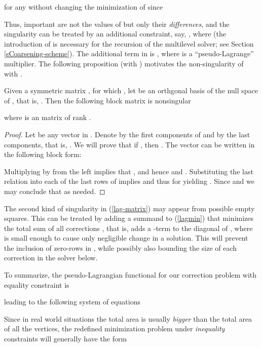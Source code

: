 \documentclass[final]{siamltex}
\begin{document}
for any  without changing the minimization of  since

Thus, important are not the values of  but only their
{\it differences}, and the singularity can be treated by an
additional constraint, say, , where  (the introduction of  is necessary for
the recursion of the multilevel solver; see Section
\ref{sCoarsening-scheme}). The additional term in
 is , where 
is a ``pseudo-Lagrange'' multiplier. The following proposition
(with ) motivates the non-singularity of  with .
\begin{proposition}
Given a symmetric  matrix , for which , let  be an orthgonal basis of the null space of
, that is, . Then the following block matrix  is
nonsingular

where  is an  matrix of rank .
\end{proposition}
\vspace{3mm}
\begin{proof}
Let  be any vector in . Denote by  the
first  components of  and by  the last  components,
that is, . We will prove that if
, then . The vector  can be written in the following
block form:

Multiplying  by  from the left implies that
, and hence  and .
Substituting the last relation into each of the last  rows of
 implies  and thus  for 
yielding . Since  and  we may conclude that
 as needed.
\end{proof}



\par The second kind of singularity in (\ref{lag-matrix}) may appear from possible empty squares. This
can be treated by adding a summand to (\ref{lagmin}) that
minimizes the total sum of all corrections , that is,  adds a -term to the diagonal of
, where  is small enough to cause only
negligible change in a solution. This will prevent the inclusion
of zero-rows in , while possibly also bounding the
size of each correction in the solver below.
\par To summarize, the pseudo-Lagrangian functional  for our correction problem with equality
constraint is

leading to the following system of equations

\par Since in real world situations the total area is usually {\it bigger}
than the total area of all the vertices, the redefined
minimization problem
under {\it inequality} constraints will generally have the form
\end{document}
